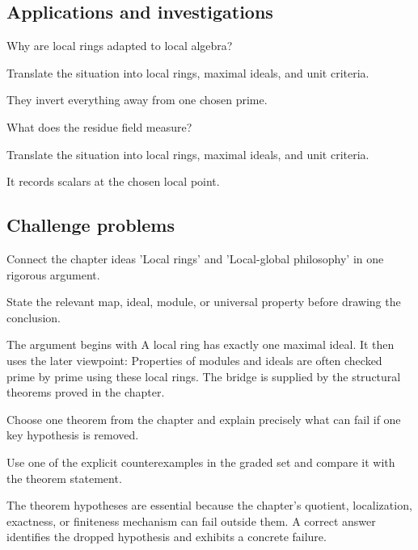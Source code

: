 \subsection*{Applications and investigations}

\begin{exercise}\label{exr:v08-expand-13}
Why are local rings adapted to local algebra?
\end{exercise}
\begin{hint}
Translate the situation into local rings, maximal ideals, and unit criteria.
\end{hint}
\begin{solution}
They invert everything away from one chosen prime.
\end{solution}

\begin{exercise}\label{exr:v08-expand-14}
What does the residue field measure?
\end{exercise}
\begin{hint}
Translate the situation into local rings, maximal ideals, and unit criteria.
\end{hint}
\begin{solution}
It records scalars at the chosen local point.
\end{solution}

\subsection*{Challenge problems}

\begin{exercise}\label{exr:v08-expand-15}
Connect the chapter ideas 'Local rings' and 'Local-global philosophy' in one rigorous argument.
\end{exercise}
\begin{hint}
State the relevant map, ideal, module, or universal property before drawing the conclusion.
\end{hint}
\begin{solution}
The argument begins with A local ring has exactly one maximal ideal. It then uses the later viewpoint: Properties of modules and ideals are often checked prime by prime using these local rings. The bridge is supplied by the structural theorems proved in the chapter.
\end{solution}

\begin{exercise}\label{exr:v08-expand-16}
Choose one theorem from the chapter and explain precisely what can fail if one key hypothesis is removed.
\end{exercise}
\begin{hint}
Use one of the explicit counterexamples in the graded set and compare it with the theorem statement.
\end{hint}
\begin{solution}
The theorem hypotheses are essential because the chapter's quotient, localization, exactness, or finiteness mechanism can fail outside them. A correct answer identifies the dropped hypothesis and exhibits a concrete failure.
\end{solution}

